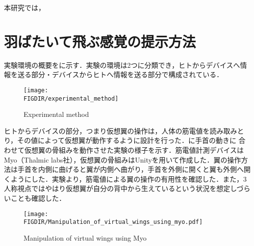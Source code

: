 \begin{small}
    
  

  本研究では，




 
  

\section{羽ばたいて飛ぶ感覚の提示方法}
  実験環境の概要をに示す．実験の環境は2つに分類でき，ヒトからデバイスへ情報を送る部分・デバイスからヒトへ情報を送る部分で構成されている．
  
  \begin{figure}[b]
    \begin{center}
      \texttt{[image: \\FIGDIR/experimental\_method]}%
      \caption{Experimental method}
    \end{center}
  \end{figure}
  
  ヒトからデバイスの部分，つまり仮想翼の操作は，人体の筋電値を読み取みとり，その値によって仮想翼が動作するように設計を行った．に手首の動きに
  合わせて仮想翼の骨組みを動作させた実験の様子を示す．筋電値計測デバイスはMyo（Thalmic labs社），仮想翼の骨組みはUnityを用いて作成した．翼の操作方法は手首を内側に曲げると翼が内側へ曲がり，手首を外側に開くと翼も外側へ開くようにした．実験より，筋電値による翼の操作の有用性を確認した．また，3人称視点ではやはり仮想翼が自分の背中から生えているという状況を想定しづらいことも確認した．

  \begin{figure}[b]
    \begin{center}
      \texttt{[image: \\FIGDIR/Manipulation\_of\_virtual\_wings\_using\_myo.pdf]}%
      \caption{Manipulation of virtual wings using Myo}
    \end{center}
  \end{figure}
  


\end{small}
